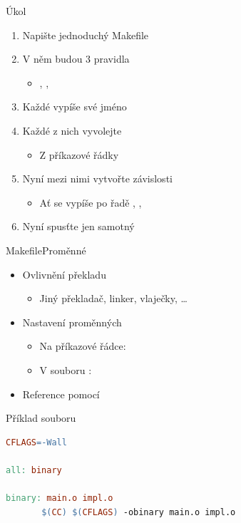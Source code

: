 \begin{frame}{Úkol}

  \begin{enumerate}
    \item Napište jednoduchý Makefile
    \item V něm budou 3 pravidla
    \begin{itemize}
      \item {}, , 
    \end{itemize}
    \item Každé vypíše své jméno
    \item Každé z nich vyvolejte
    \begin{itemize}
      \item Z příkazové řádky
    \end{itemize}

    \item Nyní mezi nimi vytvořte závislosti
    \begin{itemize}
      \item Ať se vypíše po řadě , , 
    \end{itemize}
    \item Nyní spusťte jen samotný 
  \end{enumerate}

\end{frame}

\begin{frame}[fragile]{Makefile}{Proměnné}

  \begin{itemize}
    \item Ovlivnění překladu
    \begin{itemize}
      \item Jiný překladač, linker, vlaječky, \dots
    \end{itemize}

    \pause

    \item Nastavení proměnných
    \begin{itemize}
      \item Na příkazové řádce: 
      \item V souboru : 
    \end{itemize}

    \pause

    \item Reference pomocí 
  \end{itemize}

  \begin{block}{Příklad souboru }
    \begin{lstlisting}[language=make,columns=fullflexible]
CFLAGS=-Wall

all: binary

binary: main.o impl.o
       $(CC) $(CFLAGS) -obinary main.o impl.o
    \end{lstlisting} %
  \end{block}

\end{frame}

